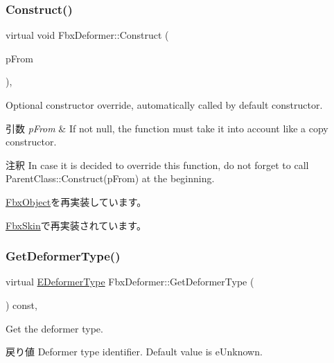 \subsubsection{\texorpdfstring{Construct()}{Construct()}}
{\footnotesize\ttfamily virtual void Fbx\+Deformer\+::\+Construct (\begin{DoxyParamCaption}\item[{const \hyperlink{class_fbx_object}{Fbx\+Object} $\ast$}]{p\+From }\end{DoxyParamCaption})\hspace{0.3cm}{\ttfamily [protected]}, {\ttfamily [virtual]}}

Optional constructor override, automatically called by default constructor. 
\begin{DoxyParams}{引数}
{\em p\+From} & If not null, the function must take it into account like a copy constructor. \\
\hline
\end{DoxyParams}
\begin{DoxyRemark}{注釈}
In case it is decided to override this function, do not forget to call Parent\+Class\+::\+Construct(p\+From) at the beginning. 
\end{DoxyRemark}


\hyperlink{class_fbx_object_a313503bc645af3fdceb4a99ef5cea7eb}{Fbx\+Object}を再実装しています。



\hyperlink{class_fbx_skin_aeebbc037507285cdb2e066f420970208}{Fbx\+Skin}で再実装されています。

\mbox{\label{class_fbx_deformer_adbc586e383f788f24d7fce9ed859d481}} 
\subsubsection{\texorpdfstring{Get\+Deformer\+Type()}{GetDeformerType()}}
{\footnotesize\ttfamily virtual \hyperlink{class_fbx_deformer_a07e2cfb767191ba5c8799fdfbfe3eaf6}{E\+Deformer\+Type} Fbx\+Deformer\+::\+Get\+Deformer\+Type (\begin{DoxyParamCaption}{ }\end{DoxyParamCaption}) const\hspace{0.3cm}{\ttfamily [inline]}, {\ttfamily [virtual]}}

Get the deformer type. \begin{DoxyReturn}{戻り値}
Deformer type identifier. Default value is e\+Unknown. 
\end{DoxyReturn}


